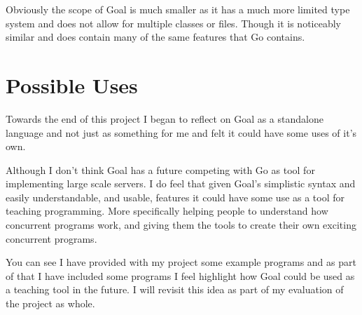 Obviously the scope of Goal is much smaller as it has a much more limited type system and does not allow for multiple classes or files. Though it is noticeably similar and does contain many of the same features that Go contains. 

\section{Possible Uses}

Towards the end of this project I began to reflect on Goal as a standalone language and not just as something for me and felt it could have some uses of it's own.

Although I don't think Goal has a future competing with Go as tool for implementing large scale servers. I do feel that given Goal's simplistic syntax and easily understandable, and usable, features it could have some use as a tool for teaching programming. More specifically helping people to understand how concurrent programs work, and giving them the tools to create their own exciting concurrent programs.

You can see I have provided with my project some example programs and as part of that I have included some programs I feel highlight how Goal could be used as a teaching tool in the future. I will revisit this idea as part of my evaluation of the project as whole.    
